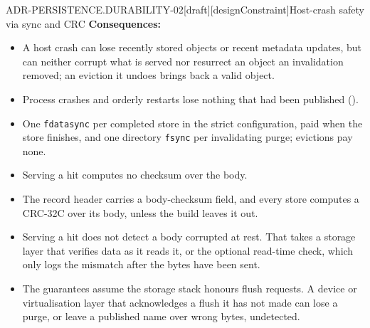 \begin{requirement}{ADR-PERSISTENCE.DURABILITY-02}[draft][designConstraint]{Host-crash safety via sync and CRC}
  \textbf{Consequences:}
  \begin{itemize}
    \item[+] A host crash can lose recently stored objects or recent metadata
      updates, but can neither corrupt what is served nor resurrect an object
      an invalidation removed; an eviction it undoes brings back a valid
      object.
    \item[+] Process crashes and orderly restarts lose nothing that had been
      published ().
    \item[--] One \texttt{fdatasync} per completed store in the strict
      configuration, paid when the store finishes, and one directory
      \texttt{fsync} per invalidating purge; evictions pay none.
    \item[+] Serving a hit computes no checksum over the body.
    \item[--] The record header carries a body-checksum field, and every
      store computes a CRC-32C over its body, unless the build leaves it out.
    \item[--] Serving a hit does not detect a body corrupted at rest. That
      takes a storage layer that verifies data as it reads it, or the
      optional read-time check, which only logs the mismatch after the bytes
      have been sent.
    \item[--] The guarantees assume the storage stack honours flush requests.
      A device or virtualisation layer that acknowledges a flush it has not
      made can lose a purge, or leave a published name over wrong bytes,
      undetected.
  \end{itemize}



\end{requirement}

